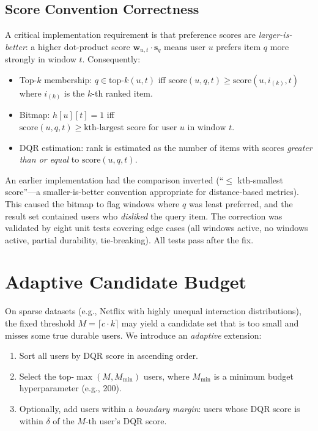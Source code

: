 \subsection{Score Convention Correctness}

A critical implementation requirement is that preference scores are \emph{larger-is-better}: a higher dot-product score $\mathbf{w}_{u,t} \cdot \mathbf{s}_q$ means user $u$ prefers item $q$ more strongly in window $t$. Consequently:
\begin{itemize}
  \item Top-$k$ membership: $q \in \text{top-}k(u, t)$ iff $\text{score}(u, q, t) \geq \text{score}(u, i_{(k)}, t)$ where $i_{(k)}$ is the $k$-th ranked item.
  \item Bitmap: $h[u][t] = 1$ iff $\text{score}(u, q, t) \geq \text{kth-largest score for user }u\text{ in window }t$.
  \item DQR estimation: rank is estimated as the number of items with scores \emph{greater than or equal} to $\text{score}(u, q, t)$.
\end{itemize}

An earlier implementation had the comparison inverted (``$\leq$ kth-smallest score''---a smaller-is-better convention appropriate for distance-based metrics). This caused the bitmap to flag windows where $q$ was least preferred, and the result set contained users who \emph{disliked} the query item. The correction was validated by eight unit tests covering edge cases (all windows active, no windows active, partial durability, tie-breaking). All tests pass after the fix.

\section{Adaptive Candidate Budget}
\label{sec:adaptive}

On sparse datasets (e.g., Netflix with highly unequal interaction distributions), the fixed threshold $M = \lceil c \cdot k \rceil$ may yield a candidate set that is too small and misses some true durable users. We introduce an \textit{adaptive} extension:

\begin{enumerate}
  \item Sort all users by DQR score in ascending order.
  \item Select the top-$\max(M, M_{\min})$ users, where $M_{\min}$ is a minimum budget hyperparameter (e.g., 200).
  \item Optionally, add users within a \textit{boundary margin}: users whose DQR score is within $\delta$ of the $M$-th user's DQR score.
\end{enumerate}

